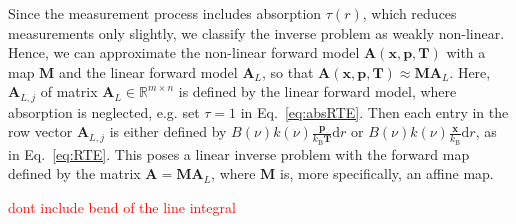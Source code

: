 Since the measurement process includes absorption $\tau(r)$, which reduces measurements only slightly, we classify the inverse problem as weakly non-linear. 
Hence, we can approximate the non-linear forward model $\bm{A}(\bm{x},  \bm{p},\bm{T})$ with a map $\bm{M}$ and the linear forward model $\bm{A}_L$, so that $\bm{A}(\bm{x},  \bm{p},\bm{T}) \approx \bm{M} \bm{A}_L $.
Here, $\bm{A}_{L,j} $ of matrix $\bm{A}_L \in \mathbb{R}^{m \times n}$ is defined by the linear forward model, where absorption is neglected, e.g. set $\tau = 1$ in Eq.~\eqref{eq:absRTE}. 
Then each entry in the row vector $\bm{A}_{L,j} $ is either defined by $ B(\nu) k(\nu)   \frac{\bm{p}}{k_{\text{B}} \bm{T}}  \text{d}r$ or $B(\nu) k(\nu)   \frac{\bm{x}}{k_{\text{B}}}  \text{d}r$, as in Eq.~\eqref{eq:RTE}.
This poses a linear inverse problem with the forward map defined by the matrix $\bm{A} = \bm{M} \bm{A}_L$, where $\bm{M}$ is, more specifically, an affine map.



\textcolor{red}{dont include bend of the line integral}

